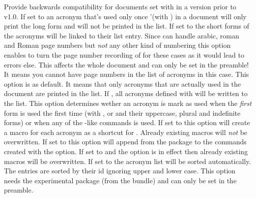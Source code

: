 \documentclass[DIV10,toc=index,toc=bib,hyperfootnotes=false]{cnpkgdoc}
\makeatletter
\providecommand*\sinceversion[1]{%
  \@bsphack
  \marginnote{%
    \footnotesize\sffamily\RaggedRight
    \textcolor{black!75}{Introduced in version~#1}}%
  \@esphack}
\makeatother
\begin{document}
\begin{beschreibung}
   Provide backwards compatibility for documents set with \acro in a version
   prior to v1.0.
   If set to  an acronym that's used only once '(with ) in a
   document will only print the long form and will not be printed in the list.
   If set to  the short forms of the acronyms will be linked to their
   list entry.
   Since \acro can handle arabic, roman and Roman page numbers but \emph{not}
   any other kind of numbering this option enables to turn the page number
   recording of for these cases as it would lead to errors else. This affects
   the whole document and can only be set in the preamble! It means you cannot
   have page numbers in the list of acronyms in this case.
   This option is  as default. It means that only acronyms that are
   actually used in the document are printed in the list. If , all
   acronyms defined with  will be written to the list.
   \sinceversion{1.2}%
   This option determines wether an acronym is mark as used when the \emph{first}
   form is used the first time (with ,  or  and
   their uppercase, plural and indefinite forms) or when any of the -like
   commands is used.   
   If set to  this option will create a macro  for each
   acronym as a shortcut for .  Already existing macros will
   \emph{not} be overwritten.
   \sinceversion{0.6}If set to  this option will append 
   from the  package to the commands created with the 
   option.
   If set to  and the option  is in effect then
   already existing macros will be overwritten.
   If set to  the acronym list will be sorted automatically. The
   entries are sorted by their \acs{id} ignoring upper and lower case. This
   option needs the experimental package  (from the
    bundle) and can only be set in the preamble.

\end{beschreibung}
\end{document}
